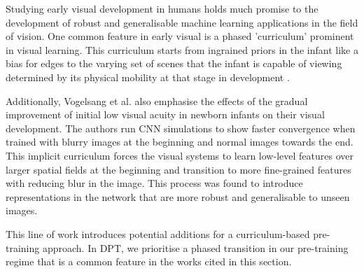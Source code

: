 Studying early visual development \cite{zaadnoordijk2022infantlessons, smith2017developmental} in humans holds much promise to the development of robust and generalisable machine learning applications in the field of vision. One common feature in early visual is a phased 'curriculum' prominent in visual learning. This curriculum starts from ingrained priors in the infant like a bias for edges \cite{linsley2020recurrentedge} to the varying set of scenes that the infant is capable of viewing determined by its physical mobility at that stage in development \cite{zaadnoordijk2022infantlessons, smith2017developmental}.

Additionally, Vogelsang et al. \cite{vogelsang2018potential} also emphasise the effects of the gradual improvement of initial low visual acuity in newborn infants on their visual development. The authors run CNN simulations to show faster convergence when trained with blurry images at the beginning and normal images towards the end. This implicit curriculum forces the visual systems to learn low-level features over larger spatial fields at the beginning and transition to more fine-grained features with reducing blur in the image. This process was found to introduce representations in the network that are more robust and generalisable to unseen images. 

This line of work introduces potential additions for a curriculum-based pre-training approach. In DPT, we prioritise a phased transition in our pre-training regime that is a common feature in the works cited in this section.
